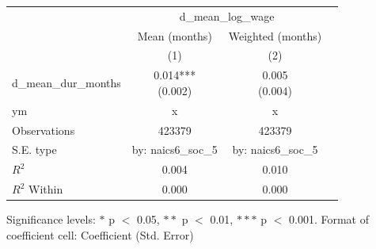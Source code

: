 \renewcommand\cellalign{t}
\begin{threeparttable}
\begin{tabular}{lccc}
\toprule
 & \multicolumn{2}{c}{d_mean_log_wage} \\
\cmidrule(lr){2-3} 
 & Mean (months) & Weighted (months) \\
 & (1) & (2) \\
\midrule
\addlinespace
d_mean_dur_months & \makecell{0.014*** \\ (0.002)} & \makecell{0.005 \\ (0.004)} \\
\midrule
\addlinespace
ym & x & x \\
\midrule
\addlinespace
Observations & 423379 & 423379 \\
S.E. type & by: naics6_soc_5 & by: naics6_soc_5 \\
$R^2$ & 0.004 & 0.010 \\
$R^2$ Within & 0.000 & 0.000 \\
\bottomrule
\end{tabular}
\footnotesize Significance levels: $*$ p $<$ 0.05, $**$ p $<$ 0.01, $***$ p $<$ 0.001. Format of coefficient cell: Coefficient 
 (Std. Error)
\end{threeparttable}